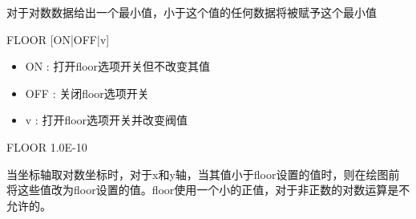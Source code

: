 \label{cmd:floor}

对于对数数据给出一个最小值，小于这个值的任何数据将被赋予这个最小值

\begin{SACSTX}
FLOOR [ON|OFF|v]
\end{SACSTX}

\begin{itemize}
\item ON : 打开floor选项开关但不改变其值
\item OFF : 关闭floor选项开关
\item v : 打开floor选项开关并改变阀值
\end{itemize}

\begin{SACDFT}
FLOOR 1.0E-10
\end{SACDFT}

当坐标轴取对数坐标时，对于x和y轴，当其值小于floor设置的值时，则在绘图前将这些值改为floor设置的值。floor使用一个小的正值，对于非正数的对数运算是不允许的。
